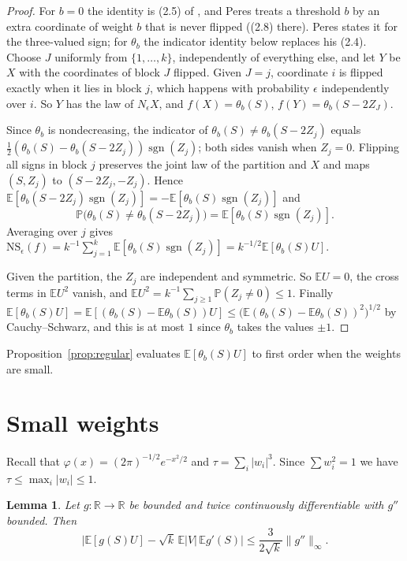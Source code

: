 \documentclass[11pt]{amsart}
\newtheorem{lemma}[theorem]{Lemma}
\theoremstyle{remark}
\numberwithin{equation}{section}
\newcommand{\PP}{\mathbb{P}}
\newcommand{\EE}{\mathbb{E}}
\newcommand{\R}{\mathbb{R}}
\newcommand{\sgnz}{\operatorname{sgn}}
\begin{document}
\begin{proof}
For $b=0$ the identity is (2.5) of \cite{Per04}, and Peres treats a threshold $b$ by an extra coordinate of weight $b$ that is never flipped ((2.8) there). Peres states it for the three-valued sign; for $\theta_b$ the indicator identity below replaces his (2.4). Choose $J$ uniformly from $\{1,\dots,k\}$, independently of everything else, and let $Y$ be $X$ with the coordinates of block $J$ flipped. Given $J=j$, coordinate $i$ is flipped exactly when it lies in block $j$, which happens with probability $\epsilon$ independently over $i$. So $Y$ has the law of $N_\epsilon X$, and $f(X)=\theta_b(S)$, $f(Y)=\theta_b(S-2Z_J)$.

Since $\theta_b$ is nondecreasing, the indicator of $\theta_b(S)\ne \theta_b(S-2Z_j)$ equals $\tfrac12(\theta_b(S)-\theta_b(S-2Z_j))\sgnz(Z_j)$; both sides vanish when $Z_j=0$. Flipping all signs in block $j$ preserves the joint law of the partition and $X$ and maps $(S,Z_j)$ to $(S-2Z_j,-Z_j)$. Hence $\EE[\theta_b(S-2Z_j)\sgnz(Z_j)]=-\EE[\theta_b(S)\sgnz(Z_j)]$ and
\[
\PP\bigl(\theta_b(S)\ne \theta_b(S-2Z_j)\bigr)=\EE[\theta_b(S)\sgnz(Z_j)].
\]
Averaging over $j$ gives $\mathrm{NS}_\epsilon(f)=k^{-1}\sum_{j=1}^k\EE[\theta_b(S)\sgnz(Z_j)]=k^{-1/2}\EE[\theta_b(S)U]$.

Given the partition, the $Z_j$ are independent and symmetric. So $\EE U=0$, the cross terms in $\EE U^2$ vanish, and $\EE U^2=k^{-1}\sum_{j\ge1}\PP(Z_j\ne0)\le1$. Finally $\EE[\theta_b(S)U]=\EE[(\theta_b(S)-\EE \theta_b(S))U]\le\bigl(\EE(\theta_b(S)-\EE \theta_b(S))^2\bigr)^{1/2}$ by Cauchy--Schwarz, and this is at most $1$ since $\theta_b$ takes the values $\pm1$.
\end{proof}

Proposition~\ref{prop:regular} evaluates $\EE[\theta_b(S)U]$ to first order when the weights are small.

\section{Small weights}\label{sec:regular}

Recall that $\varphi(x)=(2\pi)^{-1/2}e^{-x^2/2}$ and $\tau=\sum_i|w_i|^3$. Since $\sum w_i^2=1$ we have $\tau\le\max_i|w_i|\le1$.

\begin{lemma}\label{lem:smooth}
Let $g\colon\R\to\R$ be bounded and twice continuously differentiable with $g''$ bounded. Then
\[
\bigl|\EE[g(S)U]-\sqrt k\,\EE|V|\,\EE g'(S)\bigr|\le\frac{3}{2\sqrt k}\|g''\|_\infty .
\]
\end{lemma}
\end{document}

